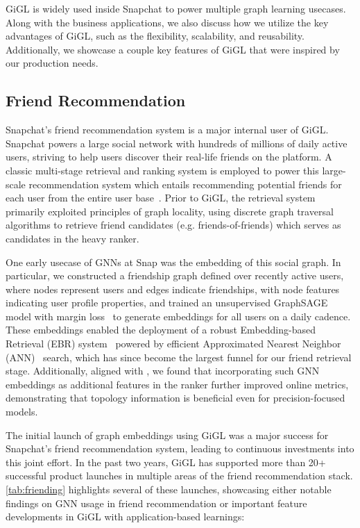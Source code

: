 

GiGL is widely used inside Snapchat to power multiple graph learning usecases. Along with the business applications, we also discuss how we utilize the key advantages of GiGL, such as the flexibility, scalability, and reusability. Additionally, we showcase a couple key features of GiGL that were inspired by our production needs.

\subsection{Friend Recommendation}
\label{sec:friending}

Snapchat's friend recommendation system is a major internal user of GiGL.  Snapchat powers a large social network with hundreds of millions of daily active users, striving to help users discover their real-life friends on the platform. A classic multi-stage retrieval and ranking system is employed to power this large-scale recommendation system which entails recommending potential friends for each user from the entire user base~\citep{shi2023embedding}. Prior to GiGL, the retrieval system primarily exploited principles of graph locality, using discrete graph traversal algorithms to retrieve friend candidates (e.g. friends-of-friends) which serves as candidates in the heavy ranker.

One early usecase of GNNs at Snap was the embedding of this social graph.  In particular, we constructed a friendship graph defined over recently active users, where nodes represent users and edges indicate friendships, with node features indicating  user profile properties, and trained an unsupervised GraphSAGE model with margin loss~\citep{hamilton2017inductive} to generate embeddings for all users on a daily cadence. These embeddings enabled the deployment of a robust Embedding-based Retrieval (EBR) system~\citep{shi2023embedding} powered by efficient Approximated Nearest Neighbor (ANN)~\citep{shi2023embedding} search, which has since become the largest funnel for our friend retrieval stage. 
Additionally, aligned with \citet{sankar2021graph}, we found that incorporating such GNN embeddings as additional features in the ranker further improved online metrics, demonstrating that topology information is beneficial even for precision-focused models. %



The initial launch of graph embeddings using GiGL was a major success for Snapchat's friend recommendation system, leading to continuous investments into this joint effort. In the past two years, GiGL has supported more than 20+ successful product launches in multiple areas of the friend recommendation stack. \cref{tab:friending} highlights several of these launches, showcasing either notable findings on GNN usage in friend recommendation or important feature developments in GiGL with application-based learnings:

